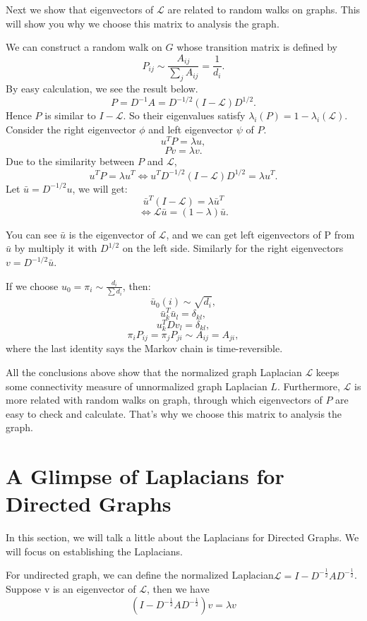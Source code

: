 \documentclass[twoside]{article}
\theoremstyle{definition}
\theoremstyle{definition}
\theoremstyle{remark}
\def\L{{\mathcal L}}
\begin{document}
Next we show that eigenvectors of $\L$ are related to random walks on graphs. This will show you why we choose this matrix to analysis the graph.

We can construct a random walk on $G$ whose transition matrix is defined by
\[{P_{ij}} \sim \frac{{{A_{ij}}}}{{\sum\limits_j {{A_{ij}}} }} = \frac{1}{{{d_i}}}.\]
By easy calculation, we see the result below.
\[P = {D^{ - 1}}A = {D^{ - 1/2}}(I - \L){D^{1/2}}.\]
Hence $P$ is similar to $I-\L$. So their eigenvalues satisfy $\lambda_i (P) = 1 - \lambda_i(\L)$.
Consider the right eigenvector $\phi$ and left eigenvector $\psi$ of $P$.
\[{u^T}P = \lambda {u},\]
\[Pv = \lambda v.\]
Due to the similarity between $P$ and $\L$,
\[{u^T}P = \lambda {u^T} \Leftrightarrow {u^T}{D^{ - 1/2}}(I - \L){D^{1/2}} = \lambda {u^T}.\]
Let $\bar{u}  = {D^{ - 1/2}}u$, we will get:
\[{\bar{u} ^T}(I - \L) = \lambda {\bar{u} ^T}\]
\[\Leftrightarrow \L\bar{u}  = (1 - \lambda )\bar{u} .\]

You can see $\bar{u}$ is the eigenvector of $\mathcal L$, and we can get left eigenvectors of P from $\bar{u}$ by multiply it with $D^{1/2}$ on the left side. Similarly for the right eigenvectors $v= D^{-1/2} \bar{u}$.

If we choose ${u_0} = {\pi _i} \sim \frac{{{d_i}}}{{\sum {{d_i}} }}$, then:
\[\bar{u}_0 (i) \sim \sqrt {{d_i}} ,\]
\[\bar{u}_k^T \bar{u}_l = {\delta _{kl}},\]
\[u_k^T D{v_l} = {\delta _{kl}},\]
\[{\pi _i}{P_{ij}} = {\pi _j}{P_{ji}} \sim {A_{ij}} = {A_{ji}},\]
where the last identity says the Markov chain is time-reversible.

All the conclusions above show that the normalized graph Laplacian $\L$ keeps some connectivity measure of unnormalized graph Laplacian $L$. Furthermore, $\L$ is more related with random walks on graph, through which eigenvectors of $P$ are
 easy to check and calculate. That's why we choose this matrix to analysis the graph.


\section{A Glimpse of Laplacians for Directed Graphs}


In this section, we will talk a little about the Laplacians for Directed Graphs.  We will focus on establishing the Laplacians.

For undirected graph, we can define the normalized Laplacian$\L=I-D^{-\frac{1}{2}}AD^{-\frac{1}{2}}$.  Suppose v is an eigenvector of $\L$, then we have $$(I-D^{-\frac{1}{2}}AD^{-\frac{1}{2}})v=\lambda v$$
\end{document}
